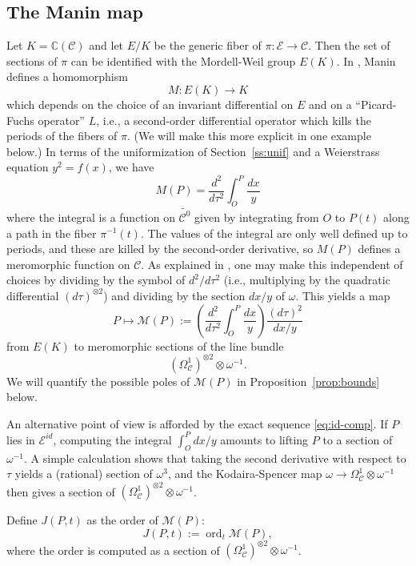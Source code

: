 \documentclass[12pt,reqno]{amsart}
\numberwithin{equation}{section}
\theoremstyle{plain}
\theoremstyle{definition}
\theoremstyle{remark}
\newcommand{\CC}{\mathcal{C}}
\newcommand{\EE}{\mathcal{E}}
\newcommand{\MM}{\mathcal{M}}
\newcommand{\C}{\mathbb{C}}
\newcommand{\<}{\langle}
\renewcommand{\>}{\rangle}
\newcommand{\tensor}{\otimes}
\DeclareMathOperator{\ord}{ord}
\numberwithin{equation}{section}
\begin{document}
\subsection{The Manin map}
Let $K=\C(\CC)$ and let $E/K$ be the generic fiber of $\pi:\EE\to\CC$.
Then the set of sections of $\pi$ can be identified with the
Mordell-Weil group $E(K)$.  In \cite{Manin63b}, Manin defines a
homomorphism
\[M:E(K)\to K\]
which depends on the choice of an invariant differential on $E$ and on
a ``Picard-Fuchs operator'' $L$, i.e., a second-order differential
operator which kills the periods of the fibers of $\pi$.  (We will
make this more explicit in one example below.)  In terms of the
uniformization of Section~\ref{ss:unif} and a Weierstrass equation
$y^2=f(x)$, we have
\begin{equation}\label{eq:M}
M(P)=\frac{d^2}{d\tau^2}\int_O^P\frac{dx}y  
\end{equation}
where the integral is a function on $\widetilde{\CC^0}$ given by
integrating from $O$ to $P(t)$ along a path in the fiber
$\pi^{-1}(t)$. The values of the integral are only well defined up to
periods, and these are killed by the second-order derivative, so
$M(P)$ defines a meromorphic function on $\CC$.  As explained in
\cite{Manin98}, one may make this independent of choices by dividing
by the symbol of $d^2/d\tau^2$ (i.e., multiplying by the
quadratic differential $(d\tau)^{\tensor2}$) and dividing by the
section $dx/y$ of $\omega$.  This yields a map
\begin{equation}\label{eq:MM}
P\mapsto\MM(P):=\left(\frac{d^2}{d\tau^2}\int_O^P\frac{dx}y\right)
  \frac{(d\tau)^2}{dx/y}  
\end{equation}
from $E(K)$ to
meromorphic sections of the line bundle
\[\left(\Omega^1_\CC\right)^{\tensor2}\tensor\omega^{-1}.\]
We will quantify the possible poles of $\MM(P)$ in
Proposition~\ref{prop:bounds} below. 

An alternative point of view is afforded by the exact
sequence \eqref{eq:id-comp}.  If $P$ lies in $\EE^{id}$, computing the
integral $\int_O^Pdx/y$ amounts to lifting $P$ to a section of
$\omega^{-1}$.  A simple calculation shows that taking the second
derivative with respect to $\tau$ yields a (rational) section of
$\omega^3$, and the Kodaira-Spencer map
$\omega\to\Omega^1_\CC\tensor\omega^{-1}$ then gives a section of
$\left(\Omega^1_\CC\right)^{\tensor2}\tensor\omega^{-1}$.

Define $J(P,t)$ as the order of $\MM(P)$:
\[J(P,t):=\ord_t\MM(P),\]
where the order is computed as a section of
$\left(\Omega^1_\CC\right)^{\tensor2}\tensor\omega^{-1}$. 
\end{document}
